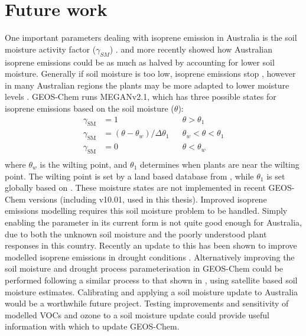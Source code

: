   
\section{Future work}
  \label{Conclusions:futurework}

  One important parameters dealing with isoprene emission in Australia is the soil moisture activity factor ($\gamma_{SM}$) \parencite{Sindelarova2014,Bauwens2016}.
  \textcite{Sindelarova2014} and more recently \textcite{Emmerson2019} showed how Australian isoprene emissions could be as much as halved by accounting for lower soil moisture.
  Generally if soil moisture is too low, isoprene emissions stop \parencite{Pegoraro2004,Niinemets2010}, however in many Australian regions the plants may be more adapted to lower moisture levels \parencite{Emmerson2019}.
  GEOS-Chem runs MEGANv2.1, which has three possible states for isoprene emissions based on the soil moisture ($\theta$):
  \begin{align*}
  \gamma_\mathrm{SM} & = 1 && \theta > \theta_1 \\
  \gamma_\mathrm{SM} & = (\theta-\theta_w)/\Delta\theta_1  && \theta_w < \theta < \theta_1 \\
  \gamma_\mathrm{SM} & = 0 && \theta < \theta_w \\
  \end{align*}
  where $\theta_w$ is the wilting point, and $\theta_1$ determines when plants are near the wilting point.
  The wilting point is set by a land based database from \textcite{Chen2001}, while $\theta_1$ is set globally based on \textcite{Pegoraro2004}.
  These moisture states are not implemented in recent GEOS-Chem versions (including v10.01, used in this thesis).
  Improved isoprene emissions modelling requires this soil moisture problem to be handled.
  Simply enabling the parameter in its current form is not quite good enough for Australia, due to both the unknown soil moisture and the poorly understood plant responses in this country.
  Recently an update to this has been shown to improve modelled isoprene emissions in drought conditions \parencite{Jiang2018}.
  Alternatively improving the soil moisture and drought process parameterisation in GEOS-Chem could be performed following a similar process to that shown in \textcite{Emmerson2019}, using satellite based soil moisture estimates.
  Calibrating and applying a soil moisture update to Australia would be a worthwhile future project.
  Testing improvements and sensitivity of modelled VOCs and ozone to a soil moisture update could provide useful information with which to update GEOS-Chem.
  
